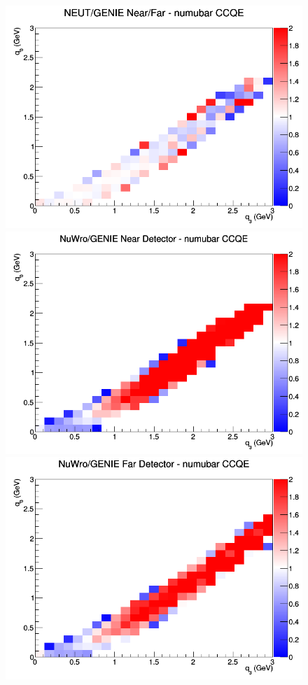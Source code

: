 \documentclass[12pt]{article}
\begin{document}
\begin{figure}[h]
\endminipage
{}
\includegraphics[width=\linewidth]{q0_q3/nominal/ratios/CCQE_NEUT_GENIE_numubar_NF_q3_q0.png}
\endminipage
\newline
{}
\includegraphics[width=\linewidth]{q0_q3/nominal/ratios/CCQE_NuWro_GENIE_numubar_near_q3_q0.png}
\endminipage
{}
\includegraphics[width=\linewidth]{q0_q3/nominal/ratios/CCQE_NuWro_GENIE_numubar_far_q3_q0.png}

\end{figure}
\end{document}
